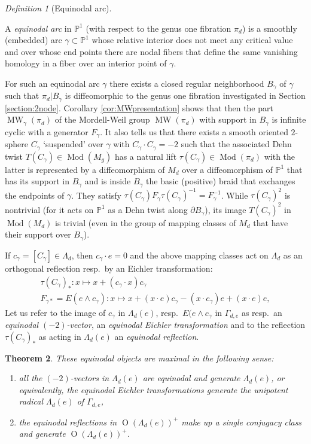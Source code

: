 \documentclass[10pt,letterpaper]{amsart}
\numberwithin{equation}{section}
\def\PP{{\mathbb P}}
\def\G{\Gamma}
\def\g{\gamma}
\newcommand{\p}{\partial}
\newcommand\Mod{\operatorname{Mod}}
\newcommand\MW{\operatorname{MW}}
\newcommand\Orth{\operatorname{O}}
\newtheorem{theorem}{Theorem}[section]
\theoremstyle{remark}
\newtheorem{definition}[theorem]{Definition}
\begin{document}
 \begin{definition}[Equinodal arc]\label{def:}
 
A \emph{equinodal arc} in $\PP^1$ (with respect to the genus one fibration $\pi_d$) is  a smoothly  (embedded) arc $\g\subset  \PP^1$  whose relative interior  does not meet any critical value and over whose end points there are nodal fibers that define the same vanishing homology in a fiber over an interior point of $\g$.
\end{definition}
 
For such an equinodal arc $\g$ there exists a closed regular neighborhood $B_\g$ of $\g$  such that $\pi_d|B_\g$ is diffeomorphic to the genus one fibration investigated  in Section \ref{section:2node}.  
Corollary \ref{cor:MWpresentation} shows that then the part 
$\MW_\gamma(\pi_d)$ of the Mordell-Weil group $\MW(\pi_d)$ with support in $B_\g$ is infinite cyclic with a 
generator $F_\gamma$. It also tells us that there exists  a smooth oriented $2$-sphere $C_\g$ `suspended' over $\gamma$ with $C_\g\cdot C_\g=-2$ such that the associated Dehn twist $T(C_\g)\in \Mod(M_g)$ has a natural lift $\tau(C_\g)\in \Mod(\pi_d)$ with the latter is represented by  a diffeomorphism of $M_d$ over a diffeomorphism of $\PP^1$ that has its support in  $B_\g$  and is inside $B_\g$ the  basic (positive) braid that exchanges the endpoints of $\g$. They satisfy $\tau (C_\g)F_\g \tau (C_\g)^{-1}=F_\g^{-1}$. While  $\tau(C_\g)^2$  is nontrivial (for it acts on $\PP^1$ as a Dehn twist along $\p B_\g$), its image $T(C_\g)^2$ in $\Mod(M_d)$ is  trivial  
(even in the group of mapping classes  of $M_d$ that have their support over  $B_\g$).
 
 If $c_\g=[C_\g]\in \Lambda_d$, then $c_\g\cdot e=0$ and the above mapping classes act on $\Lambda_d$ as  an orthogonal reflection resp.\ by an Eichler transformation:
\begin{gather*}
\tau(C_\g)_*: x\mapsto  x+(c_\g\cdot x)c_\g\\
F_{\gamma *}=E(e\wedge c_\g): x\mapsto  x +(x\cdot e)c_\g-(x\cdot c_\g)e + (x\cdot e) e,
\end{gather*}
Let us refer to the image of $c_\g$ in $\Lambda_d(e)$, resp.\  $E(e\wedge c_\g$ in $\G_{d,e}$ as resp.\ an \emph{equinodal $(-2)$-vector}, 
an \emph{equinodal Eichler transformation} and to the reflection $\tau(C_\g)_*$  as  acting in $\Lambda_d(e)$ an \emph{equinodal reflection}.

\begin{theorem}\label{thm:equinodal}
These equinodal objects are maximal in the following sense:
\begin{enumerate}
\item[(i)] all the $(-2)$-vectors in $\Lambda_d(e)$ are equinodal and generate $\Lambda_d(e)$, or equivalently, the equinodal Eichler transformations generate  the  unipotent radical $\Lambda_d(e)$ of  $\G_{d,e}$,
\item[(ii)] the equinodal reflections  in $\Orth(\Lambda_d(e))^+$ make up a single conjugacy class and generate $\Orth(\Lambda_d(e))^+$.
\end{enumerate}
\end{theorem}
\end{document}
